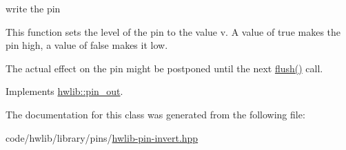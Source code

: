 write the pin

This function sets the level of the pin to the value v. A value of true makes the pin high, a value of false makes it low.

The actual effect on the pin might be postponed until the next \hyperlink{classhwlib_1_1pin__invert__from__out__t_acb6c624010c503c5703c7fb7ec771619}{flush()} call. 

Implements \hyperlink{classhwlib_1_1pin__out_a8d260a70e503dcfb81987c408e170300}{hwlib\+::pin\+\_\+out}.



The documentation for this class was generated from the following file\+:\begin{DoxyCompactItemize}
\item 
code/hwlib/library/pins/\hyperlink{hwlib-pin-invert_8hpp}{hwlib-\/pin-\/invert.\+hpp}\end{DoxyCompactItemize}
